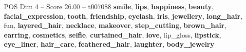 \begin{textsample}{POS Dim 4 – Score 26.00 – t007088}  \label{ex:f4_pos_009}
\textbf{smile}, \textbf{lips}, \textbf{happiness}, \textbf{beauty}, \textbf{facial\_expression}, \textbf{tooth}, \textbf{friendship}, \textbf{eyelash}, \textbf{iris}, \textbf{jewellery}, \textbf{long\_hair}, fun, \textbf{layered\_hair}, \textbf{necklace}, \textbf{makeover}, \textbf{step\_cutting}, \textbf{brown\_hair}, \textbf{earring}, \textbf{cosmetics}, \textbf{selfie}, \textbf{curtained\_hair}, \textbf{love}, lip\_gloss, \textbf{lipstick}, \textbf{eye\_liner}, \textbf{hair\_care}, \textbf{feathered\_hair}, \textbf{laughter}, \textbf{body\_jewelry}

\end{textsample}
